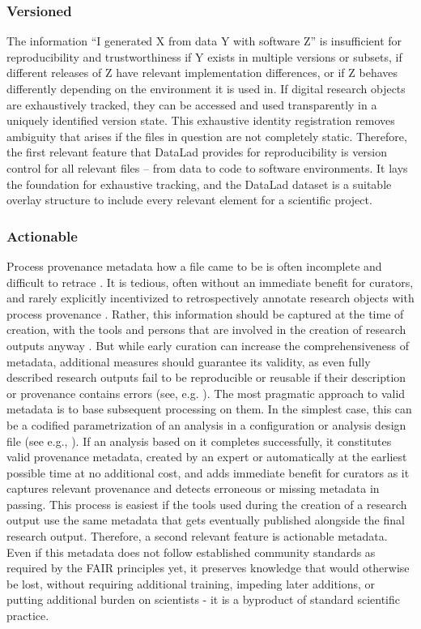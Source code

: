 \subsubsection{Versioned}

The information ``I generated X from data Y with software Z'' is insufficient for reproducibility and trustworthiness if Y exists in multiple versions or subsets, if different releases of Z have relevant implementation differences, or if Z behaves differently depending on the environment it is used in.
If digital research objects are exhaustively tracked, they can be accessed and used transparently in a uniquely identified version state.
This exhaustive identity registration removes ambiguity that arises if the files in question are not completely static.
Therefore, the first relevant feature that DataLad provides for reproducibility is version control for all relevant files -- from data to code to software environments.
It lays the foundation for exhaustive tracking, and the DataLad dataset is a suitable overlay structure to include every relevant element for a scientific project.

\subsubsection{Actionable}

Process provenance metadata how a file came to be is often incomplete and difficult to retrace \citep{hardwicke2018data}.
It is tedious, often without an immediate benefit for curators, and rarely explicitly incentivized to retrospectively annotate research objects with process provenance \citep{edwards2011science} \citep{san2009long}.
Rather, this information should be captured at the time of creation, with the tools and persons that are involved in the creation of research outputs anyway \citep{dallas2016digital}.
But while early curation can increase the comprehensiveness of metadata, additional measures should guarantee its validity, as even fully described research outputs fail to be reproducible or reusable if their description or provenance contains errors (see, e.g. \citet{manninen2017reproducibility}).
The most pragmatic approach to valid metadata is to base subsequent processing on them.
In the simplest case, this can be a codified parametrization of an analysis in a configuration or analysis design file (see e.g., \citet{jas2018reproducible}).
If an analysis based on it completes successfully, it constitutes valid provenance metadata, created by an expert or automatically at the earliest possible time at no additional cost, and adds immediate benefit for curators as it captures relevant provenance and detects erroneous or missing metadata in passing.
This process is easiest if the tools used during the creation of a research output use the same metadata that gets eventually published alongside the final research output.
Therefore, a second relevant feature is actionable metadata.
Even if this metadata does not follow established community standards as required by the \gls{FAIR} principles yet, it preserves knowledge that would otherwise be lost, without requiring additional training, impeding later additions, or putting additional burden on scientists - it is a byproduct of standard scientific practice.


